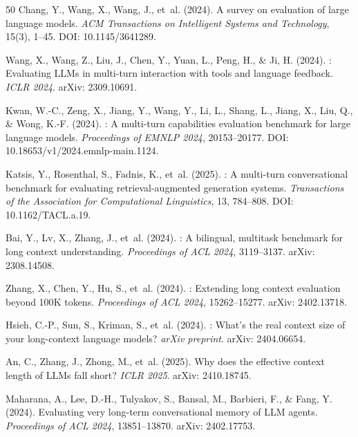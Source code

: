 \documentclass[11pt,a4paper]{article}
\begin{document}
\begin{thebibliography}{50}
Chang, Y., Wang, X., Wang, J., et~al. (2024).
\newblock A survey on evaluation of large language models.
\newblock \emph{ACM Transactions on Intelligent Systems and Technology},
15(3), 1--45.
\newblock DOI: 10.1145/3641289.

Wang, X., Wang, Z., Liu, J., Chen, Y., Yuan, L., Peng, H., \& Ji, H. (2024).
: Evaluating {LLMs} in multi-turn interaction with tools and language feedback.
\newblock \emph{ICLR 2024}.
\newblock arXiv: 2309.10691.

Kwan, W.-C., Zeng, X., Jiang, Y., Wang, Y., Li, L., Shang, L., Jiang, X., Liu, Q., \& Wong, K.-F. (2024).
: A multi-turn capabilities evaluation benchmark for large language models.
\newblock \emph{Proceedings of EMNLP 2024}, 20153--20177.
\newblock DOI: 10.18653/v1/2024.emnlp-main.1124.

Katsis, Y., Rosenthal, S., Fadnis, K., et~al. (2025).
: A multi-turn conversational benchmark for evaluating retrieval-augmented generation systems.
\newblock \emph{Transactions of the Association for Computational Linguistics}, 13, 784--808.
\newblock DOI: 10.1162/TACL.a.19.

Bai, Y., Lv, X., Zhang, J., et~al. (2024).
: A bilingual, multitask benchmark for long context understanding.
\newblock \emph{Proceedings of ACL 2024}, 3119--3137.
\newblock arXiv: 2308.14508.

Zhang, X., Chen, Y., Hu, S., et~al. (2024).
: Extending long context evaluation beyond 100{K} tokens.
\newblock \emph{Proceedings of ACL 2024}, 15262--15277.
\newblock arXiv: 2402.13718.

Hsieh, C.-P., Sun, S., Kriman, S., et~al. (2024).
: What's the real context size of your long-context language models?
\newblock \emph{arXiv preprint}.
\newblock arXiv: 2404.06654.

An, C., Zhang, J., Zhong, M., et~al. (2025).
\newblock Why does the effective context length of {LLMs} fall short?
\newblock \emph{ICLR 2025}.
\newblock arXiv: 2410.18745.

Maharana, A., Lee, D.-H., Tulyakov, S., Bansal, M., Barbieri, F., \& Fang, Y. (2024).
\newblock Evaluating very long-term conversational memory of {LLM} agents.
\newblock \emph{Proceedings of ACL 2024}, 13851--13870.
\newblock arXiv: 2402.17753.


\end{thebibliography}
\end{document}

